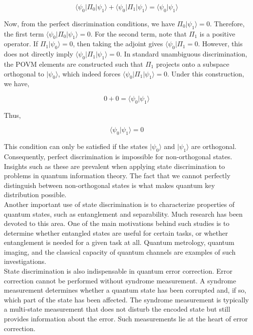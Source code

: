 \begin{equation}
    \langle\psi_0|\Pi_0|\psi_1\rangle + \langle\psi_0|\Pi_1|\psi_1\rangle = \langle\psi_0|\psi_1\rangle 
\end{equation}

Now, from the perfect discrimination conditions, we have $\Pi_0|\psi_1\rangle = 0$. Therefore, the first term $\langle\psi_0|\Pi_0|\psi_1\rangle = 0$. For the second term, note that $\Pi_1$ is a positive operator. If $\Pi_1|\psi_0\rangle = 0$, then taking the adjoint gives $\langle\psi_0|\Pi_1 = 0$. However, this does not directly imply $\langle\psi_0|\Pi_1|\psi_1\rangle = 0$. In standard unambiguous discrimination, the POVM elements are constructed such that $\Pi_1$ projects onto a subspace orthogonal to $|\psi_0\rangle$, which indeed forces $\langle\psi_0|\Pi_1|\psi_1\rangle = 0$. Under this construction, we have,

\begin{equation}
    0 + 0 = \langle\psi_0|\psi_1\rangle
\end{equation}

Thus,

\begin{equation}
    \langle\psi_0|\psi_1\rangle = 0 \tag{1.20}
\end{equation}

This condition can only be satisfied if the states $|\psi_0\rangle$ and $|\psi_1\rangle$ are orthogonal. Consequently, perfect discrimination is impossible for non-orthogonal states. Insights such as these are prevalent when applying state discrimination to problems in quantum information theory. The fact that we cannot perfectly distinguish between non-orthogonal states is what makes quantum key distribution possible.\\

Another important use of state discrimination is to characterize properties of quantum states, such as entanglement and separability. Much research has been devoted to this area. One of the main motivations behind such studies is to determine whether entangled states are useful for certain tasks, or whether entanglement is needed for a given task at all. Quantum metrology, quantum imaging, and the classical capacity of quantum channels are examples of such investigations.\\

State discrimination is also indispensable in quantum error correction. Error correction cannot be performed without syndrome measurement. A syndrome measurement determines whether a quantum state has been corrupted and, if so, which part of the state has been affected. The syndrome measurement is typically a multi-state measurement that does not disturb the encoded state but still provides information about the error. Such measurements lie at the heart of error correction.\\

